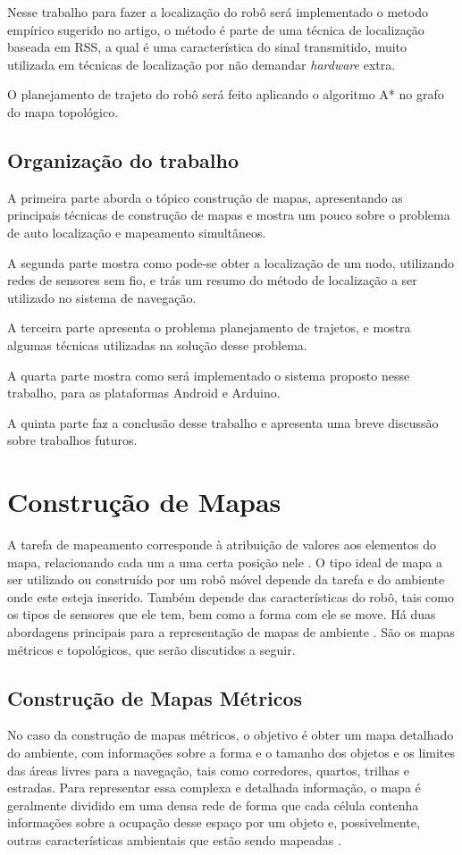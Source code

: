 \documentclass[12pt]{article}
\begin{document}
    Nesse trabalho para fazer a localização do robô será implementado o metodo empírico sugerido no artigo\cite{wifiRadar}, 
	o método é parte de uma técnica de localização baseada em RSS, a qual é uma característica 
	do sinal transmitido, muito utilizada em técnicas de localização por não demandar \textit{hardware} extra.
	
    O planejamento de trajeto do robô será feito aplicando o algoritmo A*\cite{aestrela} no grafo do mapa topológico.
    
 \subsection{Organização do trabalho}
  A primeira parte aborda o tópico construção de mapas, apresentando as principais técnicas de construção de mapas e mostra um pouco sobre o problema de auto localização e mapeamento simultâneos.
  
  A segunda parte mostra como pode-se obter a localização de um nodo, utilizando redes de sensores sem fio, e trás um resumo do método de localização a ser utilizado no sistema 
  de navegação.
  
  A terceira parte apresenta o problema planejamento de trajetos, e mostra algumas técnicas utilizadas na solução desse problema.
  
  A quarta parte mostra como será implementado o sistema proposto nesse trabalho, para as plataformas Android e Arduino.
  
  A quinta parte faz a conclusão desse trabalho e apresenta uma breve discussão sobre trabalhos futuros.
 
\clearpage
\section{Construção de Mapas}
A tarefa de mapeamento corresponde à atribuição de valores aos elementos do mapa, relacionando cada um a uma certa 
posição nele \cite{construcaoMapas2}. O tipo ideal de mapa
a ser utilizado ou construído por um robô móvel depende da tarefa e do ambiente onde
este esteja inserido. Também depende das características do robô, tais como os tipos
de sensores que ele tem, bem como a forma com ele se move\cite{construcaoMapas2}.  Há duas abordagens principais para a 
representação de mapas de ambiente \cite{construcaoMapas}.
São os mapas métricos e topológicos, que serão discutidos a seguir. 

\subsection{Construção de Mapas Métricos}
No caso da construção de mapas métricos, o objetivo é obter um mapa detalhado do ambiente, 
com informações sobre a forma e o tamanho dos objetos e os limites das
áreas livres para a navegação, tais como corredores, quartos, trilhas e estradas. Para
representar essa complexa e detalhada informação, o mapa é geralmente dividido em
uma densa rede de forma que cada célula contenha informações sobre a ocupação
desse espaço por um objeto e, possivelmente, outras características ambientais que
estão sendo mapeadas \cite{construcaoMapas2}. 
\end{document}
